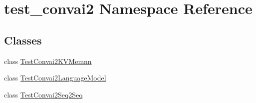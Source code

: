 \hypertarget{namespacetest__convai2}{}\section{test\+\_\+convai2 Namespace Reference}
\label{namespacetest__convai2}
\subsection*{Classes}
\begin{DoxyCompactItemize}
\item 
class \hyperlink{classtest__convai2_1_1TestConvai2KVMemnn}{Test\+Convai2\+K\+V\+Memnn}
\item 
class \hyperlink{classtest__convai2_1_1TestConvai2LanguageModel}{Test\+Convai2\+Language\+Model}
\item 
class \hyperlink{classtest__convai2_1_1TestConvai2Seq2Seq}{Test\+Convai2\+Seq2\+Seq}
\end{DoxyCompactItemize}
